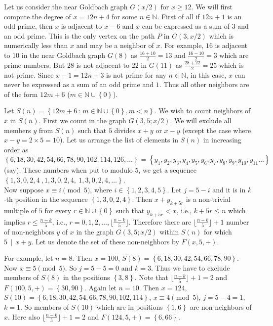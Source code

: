\documentclass[11pt]{article}
\theoremstyle{definition}
\theoremstyle{remark}
\numberwithin{equation}{section}
\newcommand{\Nat}{\mathbb{N}}
\newcommand{\set}[1]{\left\{#1\right\}}
\newcommand{\Set}[2]{\set{#1\, :\, #2}}
\newcommand{\Mod}[3]{#1\equiv #2 \pmod{#3}}
\newcommand{\Div}[2]{#1\,\mid\, #2}
\begin{document}
\vspace{1em}
\noindent
Let us consider the near Goldbach graph $G(x/2)$ for $x\geq 12$. We will first compute the degree of $x=12n+4$ for some $n\in\Nat$. First of all if $12n+1$ is an odd prime, then $x$ is adjacent to $x-6$ and $x$ can be expressed as a sum of $3$ and an odd prime. This is the only vertex on the path $P$ in $G(3,x/2)$ which is numerically less than $x$ and may be a neighbor of $x$. For example, $16$ is adjacent to $10$ in the near Goldbach graph $G(8)$ as $\frac{16+10}{2}=13$ and $\frac{16-10}{2}=3$ which are prime numbers. But $28$ is not adjacent to $22$ in $G(11)$ as $\frac{28+22}{2}=25$ which is not prime. Since $x-1=12n+3$ is not prime for any $n\in\Nat$, in this case, $x$ can never be expressed as a sum of an odd prime and $1$. Thus all other neighbors are of the form $12m+6$ ($m\in\Nat\cup\set{0}$). 

\vspace{1em}
\noindent
Let $S(n)=\Set{12m+6}{m\in\Nat\cup\set{0}, m<n}$. We wish to count neighbors of $x$ in $S(n)$. First we count in the graph $G(3,5;x/2)$. We will exclude all members $y$ from $S(n)$ such that $5$ divides $x+y$ or $x-y$ (except the case where $x-y=2\times 5=10$). Let us arrange the list of elements in $S(n)$ in increasing order as $\set{6,18,30,42,54,66,78,90,102,114,126,\ldots}=\set{y_1,y_2,y_3,y_4,y_5,y_6,y_7,y_8,y_9,y_{10},y_{11}\ldots}$ (say). These numbers when put to modulo $5$, we get a sequence $\set{1,3,0,2,4\ ,1,3,0,2,4,\ 1,3,0,2,4,\ldots}$. \\
 Now suppose $\Mod{x}{i}{5}$, where $i\in\set{1,2,3,4,5}$. Let $j=5-i$ and it is in $k$-th position in the sequence $\set{1,3,0,2,4}$. Then $x+y_{k+5r}$ is a non-trivial multiple of $5$ for every $r\in\Nat\cup\set{0}$ such that $y_{k+5r}<x$, i.e., $k+5r\leq n$ which implies $r\leq\frac{n-k}{5}$, i.e., $r=0,1,2,\ldots,\lfloor \frac{n-k}{5}\rfloor$. Therefore there are $\lfloor \frac{n-k}{5}\rfloor +1$ number of non-neighbors $y$ of $x$ in the graph $G(3,5;x/2)$ within $S(n)$ for which $\Div{5}{x+y}$. Let us denote the set of these non-neighbors by $F(x,5,+)$.

\vspace{1em}
\noindent
For example, let $n=8$. Then $x=100$, $S(8)=\set{6,18,30,42,54,66,78,90}$. Now $\Mod{x}{5}{5}$. So $j=5-5=0$ and $k=3$. Thus we have to exclude members of $S(8)$ in the positions $\set{3,8}$. Note that $\lfloor \frac{n-k}{5}\rfloor +1=2$ and $F(100,5,+)=\set{30,90}$. Again let $n=10$. Then $x=124$, $S(10)=\set{6,18,30,42,54,66,78,90,102,114}$, $\Mod{x}{4}{5}$, $j=5-4=1$, $k=1$. So members of $S(10)$ which are in positions $\set{1,6}$ are non-neighbors of $x$. Here also $\lfloor \frac{n-k}{5}\rfloor +1=2$ and $F(124,5,+)=\set{6,66}$. 
\end{document}
